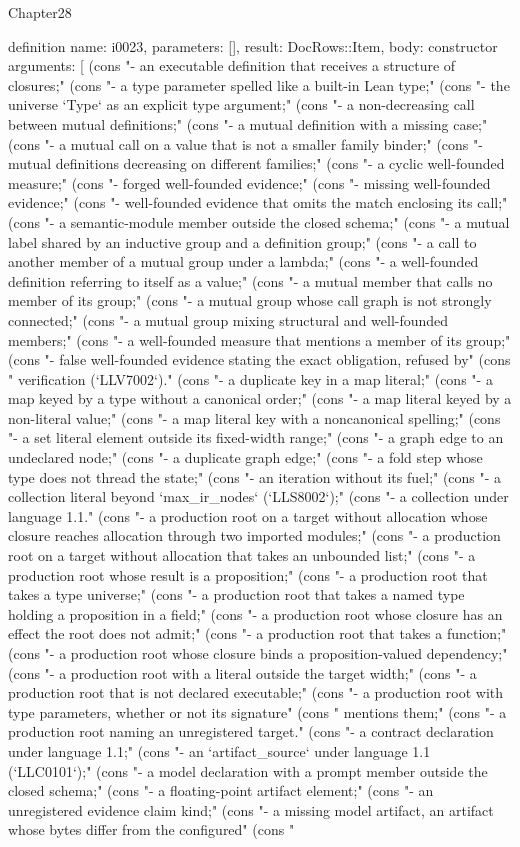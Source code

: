 \begin{lexlean}{Chapter28}
\begin{semanticmodule}
definition{
  name: i0023,
  parameters: [],
  result: DocRows::Item,
  body: constructor{
    arguments: [
      (cons "- an executable definition that receives a structure of closures;" (cons "- a type parameter spelled like a built-in Lean type;" (cons "- the universe `Type` as an explicit type argument;" (cons "- a non-decreasing call between mutual definitions;" (cons "- a mutual definition with a missing case;" (cons "- a mutual call on a value that is not a smaller family binder;" (cons "- mutual definitions decreasing on different families;" (cons "- a cyclic well-founded measure;" (cons "- forged well-founded evidence;" (cons "- missing well-founded evidence;" (cons "- well-founded evidence that omits the match enclosing its call;" (cons "- a semantic-module member outside the closed schema;" (cons "- a mutual label shared by an inductive group and a definition group;" (cons "- a call to another member of a mutual group under a lambda;" (cons "- a well-founded definition referring to itself as a value;" (cons "- a mutual member that calls no member of its group;" (cons "- a mutual group whose call graph is not strongly connected;" (cons "- a mutual group mixing structural and well-founded members;" (cons "- a well-founded measure that mentions a member of its group;" (cons "- false well-founded evidence stating the exact obligation, refused by" (cons "  verification (`LLV7002`)." (cons "- a duplicate key in a map literal;" (cons "- a map keyed by a type without a canonical order;" (cons "- a map literal keyed by a non-literal value;" (cons "- a map literal key with a noncanonical spelling;" (cons "- a set literal element outside its fixed-width range;" (cons "- a graph edge to an undeclared node;" (cons "- a duplicate graph edge;" (cons "- a fold step whose type does not thread the state;" (cons "- an iteration without its fuel;" (cons "- a collection literal beyond `max_ir_nodes` (`LLS8002`);" (cons "- a collection under language 1.1." (cons "- a production root on a target without allocation whose closure reaches allocation through two imported modules;" (cons "- a production root on a target without allocation that takes an unbounded list;" (cons "- a production root whose result is a proposition;" (cons "- a production root that takes a type universe;" (cons "- a production root that takes a named type holding a proposition in a field;" (cons "- a production root whose closure has an effect the root does not admit;" (cons "- a production root that takes a function;" (cons "- a production root whose closure binds a proposition-valued dependency;" (cons "- a production root with a literal outside the target width;" (cons "- a production root that is not declared executable;" (cons "- a production root with type parameters, whether or not its signature" (cons "  mentions them;" (cons "- a production root naming an unregistered target." (cons "- a contract declaration under language 1.1;" (cons "- an `artifact_source` under language 1.1 (`LLC0101`);" (cons "- a model declaration with a prompt member outside the closed schema;" (cons "- a floating-point artifact element;" (cons "- an unregistered evidence claim kind;" (cons "- a missing model artifact, an artifact whose bytes differ from the configured" (cons "  }}
\end{semanticmodule}
\end{lexlean}
